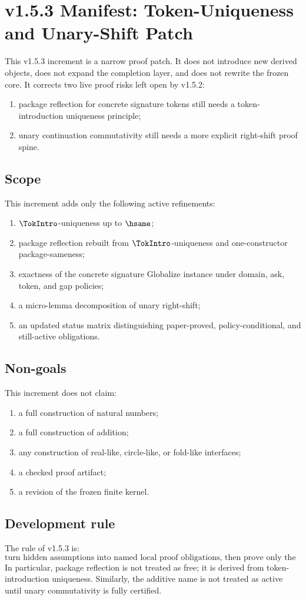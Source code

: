 \chapter{v1.5.3 Manifest: Token-Uniqueness and Unary-Shift Patch}
\label{ch:v153-manifest}

This v1.5.3 increment is a narrow proof patch. It does not introduce new derived objects, does not expand the completion layer, and does not rewrite the frozen core. It corrects two live proof risks left open by v1.5.2:
\begin{enumerate}
  \item package reflection for concrete signature tokens still needs a token-introduction uniqueness principle;
  \item unary continuation commutativity still needs a more explicit right-shift proof spine.
\end{enumerate}

\section{Scope}
This increment adds only the following active refinements:
\begin{enumerate}
  \item \(\TokIntro\)-uniqueness up to \(\hsame\);
  \item package reflection rebuilt from \(\TokIntro\)-uniqueness and one-constructor package-sameness;
  \item exactness of the concrete signature Globalize instance under domain, ask, token, and gap policies;
  \item a micro-lemma decomposition of unary right-shift;
  \item an updated status matrix distinguishing paper-proved, policy-conditional, and still-active obligations.
\end{enumerate}

\section{Non-goals}
This increment does not claim:
\begin{enumerate}
  \item a full construction of natural numbers;
  \item a full construction of addition;
  \item any construction of real-like, circle-like, or fold-like interfaces;
  \item a checked proof artifact;
  \item a revision of the frozen finite kernel.
\end{enumerate}

\section{Development rule}
The rule of v1.5.3 is:
\[
  \text{turn hidden assumptions into named local proof obligations, then prove only the low-risk consequences.}
\]
In particular, package reflection is not treated as free; it is derived from token-introduction uniqueness. Similarly, the additive name is not treated as active until unary commutativity is fully certified.
